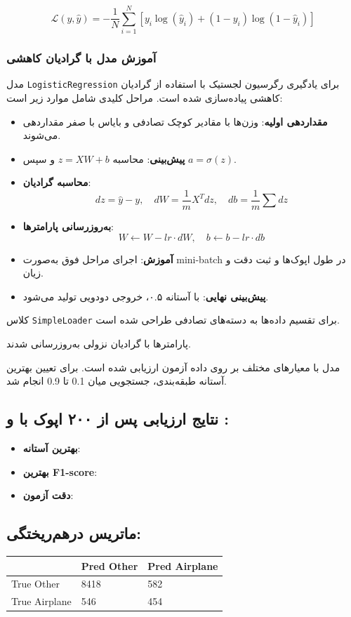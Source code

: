	\[
	\mathcal{L}(y, \hat{y}) = - \frac{1}{N} \sum_{i=1}^N \left[ y_i \log(\hat{y}_i) + (1 - y_i) \log(1 - \hat{y}_i) \right]
	\]
	
	\subsubsection{آموزش مدل با گرادیان کاهشی}
	
	مدل \texttt{LogisticRegression} برای یادگیری رگرسیون لجستیک با استفاده از گرادیان کاهشی پیاده‌سازی شده است. مراحل کلیدی شامل موارد زیر است:
	
	\begin{itemize}
		\item \textbf{مقداردهی اولیه}: وزن‌ها با مقادیر کوچک تصادفی و بایاس با صفر مقداردهی می‌شوند.
		\item \textbf{پیش‌بینی}: محاسبه $z = XW + b$ و سپس $a = \sigma(z)$.
		\item \textbf{محاسبه گرادیان}:
		\[
		dz = \hat{y} - y,\quad dW = \frac{1}{m} X^T dz,\quad db = \frac{1}{m} \sum dz
		\]
		\item \textbf{به‌روزرسانی پارامترها}:
		\[
		W \leftarrow W - lr \cdot dW,\quad b \leftarrow b - lr \cdot db
		\]
		\item \textbf{آموزش}: اجرای مراحل فوق به‌صورت mini-batch در طول اپوک‌ها و ثبت دقت و زیان.
		\item \textbf{پیش‌بینی نهایی}: با آستانه ۰.۵، خروجی دودویی تولید می‌شود.
	\end{itemize}
	
	کلاس \texttt{SimpleLoader} برای تقسیم داده‌ها به دسته‌های تصادفی طراحی شده است.
	
	
	پارامترها با گرادیان نزولی به‌روزرسانی شدند.
	
	مدل با معیارهای مختلف بر روی داده آزمون ارزیابی شده است. برای تعیین بهترین آستانه طبقه‌بندی، جستجویی میان 0.1 تا 0.9 انجام شد. 
	
	\subsection*{نتایج ارزیابی پس از ۲۰۰ اپوک با  و :}
	\begin{itemize}
		\item \textbf{بهترین آستانه}: 
		\item \textbf{بهترین F1-score}: 
		\item \textbf{دقت آزمون}: 
	\end{itemize}
	
	\subsection*{ماتریس درهم‌ریختگی:}
	\begin{center}
		\begin{tabular}{|l|l|l|}
			\hline
			& Pred Other & Pred Airplane \\ \hline
			True Other    & 8418       & 582           \\ \hline
			True Airplane & 546        & 454           \\ \hline
		\end{tabular}
	\end{center}
	

